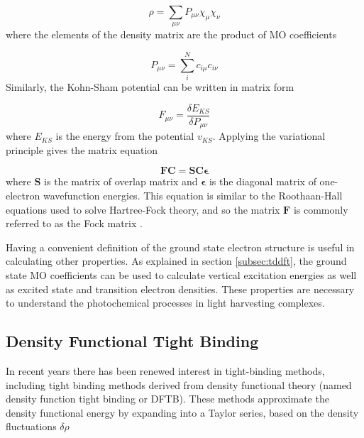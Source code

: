 \begin{equation}
    \rho = \sum_{\mu\nu} P_{\mu\nu} \chi_\mu \chi_\nu
\end{equation}
%
where the elements of the density matrix are the product of MO coefficients

\begin{equation}
    P_{\mu\nu} = \sum_i^N c_{i \mu} c_{i \nu}
\end{equation}
%
Similarly, the Kohn-Sham potential can be written in matrix form 

\begin{equation}
    F_{\mu \nu} = \frac{\delta E_{KS}}{\delta P_{\mu\nu}}
\end{equation}
%
where $E_{KS}$ is the energy from the potential $v_{KS}$. Applying the variational
principle gives the matrix equation

\begin{equation}
    \mathbf{F} \mathbf{C} = \mathbf{S} \mathbf{C} \mathbf{\epsilon}
\end{equation}
%
where $\mathbf{S}$ is the matrix of overlap matrix and $\mathbf{\epsilon}$ is the
diagonal matrix of one-electron wavefunction energies. This equation is similar 
to the Roothaan-Hall equations used to solve Hartree-Fock theory, and so the matrix
$\mathbf{F}$ is commonly referred to as the Fock matrix \cite{Roothaan1951}.

Having a convenient definition of the ground state electron structure is useful
in calculating other properties. As explained in section \ref{subsec:tddft}, the
ground state MO coefficients can be used to calculate vertical excitation energies
as well as excited state and transition electron densities. These properties are
necessary to understand the photochemical processes in light harvesting complexes.

\subsection{Density Functional Tight Binding}
\label{subsec:tight_binding}
In recent years there has been renewed interest in tight-binding methods, including
tight binding methods derived from density functional theory (named density function 
tight binding or DFTB)\cite{Porezag1994}. These methods approximate the density 
functional energy by expanding into a Taylor series, based on the density fluctuations
$\delta\rho$

